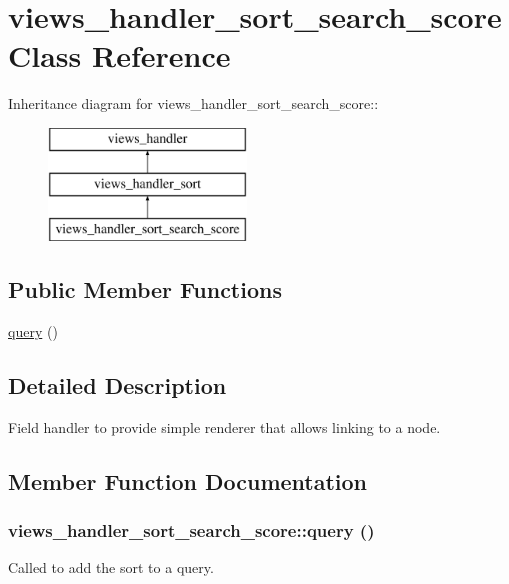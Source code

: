 \hypertarget{classviews__handler__sort__search__score}{
\section{views\_\-handler\_\-sort\_\-search\_\-score Class Reference}
\label{classviews__handler__sort__search__score}
}
Inheritance diagram for views\_\-handler\_\-sort\_\-search\_\-score::\begin{figure}[H]
\begin{center}
\leavevmode
\includegraphics[height=3cm]{classviews__handler__sort__search__score}
\end{center}
\end{figure}
\subsection*{Public Member Functions}
\begin{DoxyCompactItemize}
\item 
\hyperlink{classviews__handler__sort__search__score_a7d144db57e043dc594021228f8567726}{query} ()
\end{DoxyCompactItemize}


\subsection{Detailed Description}
Field handler to provide simple renderer that allows linking to a node. 

\subsection{Member Function Documentation}
\hypertarget{classviews__handler__sort__search__score_a7d144db57e043dc594021228f8567726}{
\subsubsection[{query}]{\setlength{\rightskip}{0pt plus 5cm}views\_\-handler\_\-sort\_\-search\_\-score::query ()}}
\label{classviews__handler__sort__search__score_a7d144db57e043dc594021228f8567726}
Called to add the sort to a query. 

